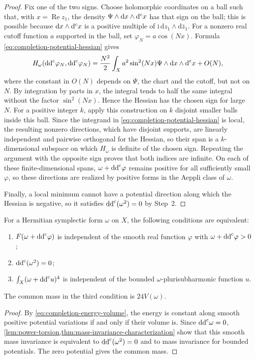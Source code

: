 \begin{proof}
Fix one of the two signs. Choose holomorphic coordinates on a ball such that, with $x=\operatorname{Re}z_1$, the density $\Psi\wedge\mathrm dx\wedge\mathrm d^{\mathrm c} x$ has that sign on the ball; this is possible because $\mathrm dx\wedge\mathrm d^{\mathrm c} x$ is a positive multiple of $\mathrm i\,\mathrm dz_1\wedge\mathrm d\bar z_1$. For a nonzero real cutoff function $a$ supported in the ball, set $\varphi_N=a\cos(Nx)$. Formula \eqref{eq:completion-potential-hessian} gives
\[
 H_\omega(\mathrm{dd}^{\mathrm{c}}\varphi_N,\mathrm{dd}^{\mathrm{c}}\varphi_N)
 =\frac{N^2}{2}\int_Xa^2\sin^2(Nx)\Psi\wedge\mathrm dx\wedge\mathrm d^{\mathrm c} x+O(N),
\]
where the constant in $O(N)$ depends on $\Psi$, the chart and the cutoff, but not on $N$. By integration by parts in $x$, the integral tends to half the same integral without the factor $\sin^2(Nx)$. Hence the Hessian has the chosen sign for large $N$. For a positive integer $k$, apply this construction on $k$ disjoint smaller balls inside this ball. Since the integrand in \eqref{eq:completion-potential-hessian} is local, the resulting nonzero directions, which have disjoint supports, are linearly independent and pairwise orthogonal for the Hessian, so their span is a $k$-dimensional subspace on which $H_\omega$ is definite of the chosen sign. Repeating the argument with the opposite sign proves that both indices are infinite. On each of these finite-dimensional spans, $\omega+\mathrm{dd}^{\mathrm{c}}\varphi$ remains positive for all sufficiently small $\varphi$, so these directions are realized by positive forms in the Aeppli class of $\omega$.

Finally, a local minimum cannot have a potential direction along which the Hessian is negative, so it satisfies $\mathrm{dd}^{\mathrm{c}}(\omega^2)=0$ by Step~2.
\end{proof}

\begin{corollary}\label{cor:completion-flat-invariant-mass}
For a Hermitian symplectic form $\omega$ on $X$, the following conditions are equivalent:
\begin{enumerate}
\item $F(\omega+\mathrm{dd}^{\mathrm{c}}\varphi)$ is independent of the smooth real function $\varphi$ with $\omega+\mathrm{dd}^{\mathrm{c}}\varphi>0$;
\item $\mathrm{dd}^{\mathrm{c}}(\omega^2)=0$;
\item $\int_X(\omega+\mathrm{dd}^{\mathrm{c}} u)^4$ is independent of the bounded $\omega$-plurisubharmonic function $u$.
\end{enumerate}
The common mass in the third condition is $24V(\omega)$.
\end{corollary}
\begin{proof}
By \eqref{eq:completion-energy-volume}, the energy is constant along smooth positive potential variations if and only if their volume is. Since $\mathrm{dd}^{\mathrm{c}}\omega=0$, \cref{lem:power-torsion,thm:mass-invariance-characterization} show that this smooth mass invariance is equivalent to $\mathrm{dd}^{\mathrm{c}}(\omega^2)=0$ and to mass invariance for bounded potentials. The zero potential gives the common mass.
\end{proof}

